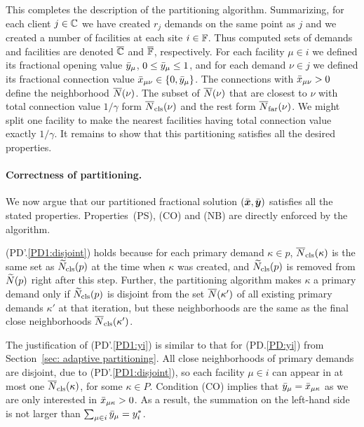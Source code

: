 This completes the description of the partitioning
algorithm. Summarizing, for each client $j\in\mathbb{C}$ we have
created $r_j$ demands on the same point as $j$ and we created a number
of facilities at each site $i\in\mathbb{F}$. Thus computed sets of
demands and facilities are denoted $\overline{\mathbb{C}}$ and $\overline{\mathbb{F}}$,
respectively.  For each facility $\mu\in i$ we defined its fractional
opening value ${\bar y}_\mu$, $0\le {\bar y}_\mu\le 1$, and for each demand
$\nu\in j$ we defined its fractional connection value
${\bar x}_{\mu\nu}\in { \left\{ 0,{\bar y}_\mu \right\} }$.  The connections with
${\bar x}_{\mu\nu} > 0$ define the neighborhood ${\overline{N}}(\nu)$. The subset
of ${\overline{N}}(\nu)$ that are closest to $\nu$ with total connection value
$1/\gamma$ form ${\overline{N}}_{{\mbox{\scriptsize\rm cls}}}(\nu)$ and the rest form
${\overline{N}}_{{\mbox{\scriptsize\rm far}}}(\nu)$. We might split one facility to make the nearest
facilities having total connection value exactly $1/\gamma$.  It
remains to show that this partitioning satisfies all the desired
properties.


\medskip
\paragraph{Correctness of partitioning.}
We now argue that our partitioned fractional solution $(\bar{\boldsymbol{x}},\bar{\boldsymbol{y}})$
satisfies all the stated properties. Properties~(PS), (CO) and (NB) are
directly enforced by the algorithm.

(PD'.\ref{PD1:disjoint}) holds because for each primary demand
$\kappa\in p$, ${\overline{N}}_{{\mbox{\scriptsize\rm cls}}}(\kappa)$ is the same set as
${\widetilde N}_{{\mbox{\scriptsize\rm cls}}}(p)$ at the time when $\kappa$ was created, and
${\widetilde N}_{{\mbox{\scriptsize\rm cls}}}(p)$ is removed from ${\widetilde N}(p)$ right after this
step. Further, the partitioning algorithm makes $\kappa$ a primary
demand only if ${\widetilde N}_{{\mbox{\scriptsize\rm cls}}}(p)$ is disjoint from the set
${\overline{N}}(\kappa')$ of all existing primary demands $\kappa'$ at that
iteration, but these neighborhoods are the same as the final close
neighborhoods ${\overline{N}}_{{\mbox{\scriptsize\rm cls}}}(\kappa')$.

The justification of (PD'.\ref{PD1:yi}) is similar to that for
(PD.\ref{PD:yi}) from Section~\ref{sec: adaptive partitioning}. All
close neighborhoods of primary demands are disjoint, due to
(PD'.\ref{PD1:disjoint}), so each facility $\mu \in i$ can appear in
at most one ${\overline{N}}_{{\mbox{\scriptsize\rm cls}}}(\kappa)$, for some $\kappa\in P$. Condition
(CO) implies that ${\bar y}_{\mu} = {\bar x}_{\mu\kappa}$ as we are only
interested in ${\bar x}_{\mu\kappa} > 0$. As a result, the summation on
the left-hand side is not larger than $\sum_{\mu\in i}{\bar y}_{\mu} =
y_i^\ast$.

